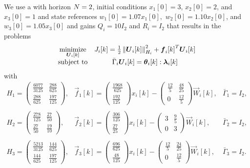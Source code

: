 \documentclass[../main.tex]{subfiles}
\begin{document}
We use a \dmpc{} with horizon ${N=2}$,
initial conditions
${x_{1}[0]=3}$,
${x_{2}[0]=2}$, and
${x_{3}[0]=1}$
and state references
${w_{1}[0]=1.07x_{1}[0]},$
${w_{2}[0]=1.10x_{2}[0]}$, and
${w_{3}[0]=1.05x_{3}[0]}$
and gains
$Q_{i}=10I_{2}$ and
$R_{i}=   I_{2}$
that results in the problems
\begin{equation}
  \begin{matrix}
    \underset{\vec{U}_{i}[k]}{\mathrm{minimize}}&\obji=\frac{1}{2}\norm{\vec{U}_{i}[k]}^{2}_{H_{i}} + {\vec{f}_{i}[k]}^{T}\vec{U}_{i}[k]\\
    \mathrm{subject~ to} & \bar{\Gamma}_{i}\vec{U}_{i}[k] = \thetaik:\lambdaik
  \end{matrix}
  \label{eq:example_local_problem}
\end{equation}
with
\begin{equation}
  \label{eq:1}
  \begin{array}{lll}
H_1=\left(\begin{array}{cc} \frac{6077}{3125} & \frac{288}{625}\\ \frac{288}{625} & \frac{197}{125} \end{array}\right), & \vec{f}_1[k]=\left(\begin{array}{c} \frac{1968}{625}\\ \frac{192}{125} \end{array}\right)x_i[k]-\left(\begin{array}{cc} \frac{12}{5} & \frac{48}{25}\\ 0 & \frac{12}{5} \end{array}\right)\vec{W}_i[k], & \bar{\Gamma}_1=I_2,\\\\
H_2=\left(\begin{array}{cc} \frac{278}{125} & \frac{27}{50}\\ \frac{27}{50} & \frac{19}{10} \end{array}\right), & \vec{f}_2[k]=\left(\begin{array}{c} \frac{306}{125}\\ \frac{27}{25} \end{array}\right)x_i[k]-\left(\begin{array}{cc} 3 & \frac{9}{5}\\ 0 & 3 \end{array}\right)\vec{W}_i[k], & \bar{\Gamma}_2=I_2,\\\\
H_3=\left(\begin{array}{cc} \frac{5213}{3125} & \frac{144}{625}\\ \frac{144}{625} & \frac{197}{125} \end{array}\right), & \vec{f}_3[k]=\left(\begin{array}{c} \frac{696}{625}\\ \frac{48}{125} \end{array}\right)x_i[k]-\left(\begin{array}{cc} \frac{12}{5} & \frac{24}{25}\\ 0 & \frac{12}{5} \end{array}\right)\vec{W}_i[k], & \bar{\Gamma}_3=I_2.\\\\
  \end{array}
\end{equation}
\end{document}
